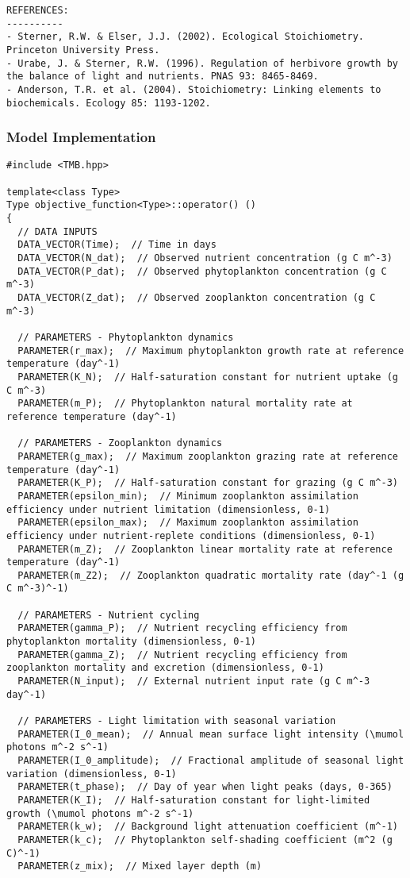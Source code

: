 \begin{lstlisting}
REFERENCES:
----------
- Sterner, R.W. & Elser, J.J. (2002). Ecological Stoichiometry. Princeton University Press.
- Urabe, J. & Sterner, R.W. (1996). Regulation of herbivore growth by the balance of light and nutrients. PNAS 93: 8465-8469.
- Anderson, T.R. et al. (2004). Stoichiometry: Linking elements to biochemicals. Ecology 85: 1193-1202.
\end{lstlisting}

\subsubsection{Model Implementation}
\begin{lstlisting}
#include <TMB.hpp>

template<class Type>
Type objective_function<Type>::operator() ()
{
  // DATA INPUTS
  DATA_VECTOR(Time);  // Time in days
  DATA_VECTOR(N_dat);  // Observed nutrient concentration (g C m^-3)
  DATA_VECTOR(P_dat);  // Observed phytoplankton concentration (g C m^-3)
  DATA_VECTOR(Z_dat);  // Observed zooplankton concentration (g C m^-3)
  
  // PARAMETERS - Phytoplankton dynamics
  PARAMETER(r_max);  // Maximum phytoplankton growth rate at reference temperature (day^-1)
  PARAMETER(K_N);  // Half-saturation constant for nutrient uptake (g C m^-3)
  PARAMETER(m_P);  // Phytoplankton natural mortality rate at reference temperature (day^-1)
  
  // PARAMETERS - Zooplankton dynamics
  PARAMETER(g_max);  // Maximum zooplankton grazing rate at reference temperature (day^-1)
  PARAMETER(K_P);  // Half-saturation constant for grazing (g C m^-3)
  PARAMETER(epsilon_min);  // Minimum zooplankton assimilation efficiency under nutrient limitation (dimensionless, 0-1)
  PARAMETER(epsilon_max);  // Maximum zooplankton assimilation efficiency under nutrient-replete conditions (dimensionless, 0-1)
  PARAMETER(m_Z);  // Zooplankton linear mortality rate at reference temperature (day^-1)
  PARAMETER(m_Z2);  // Zooplankton quadratic mortality rate (day^-1 (g C m^-3)^-1)
  
  // PARAMETERS - Nutrient cycling
  PARAMETER(gamma_P);  // Nutrient recycling efficiency from phytoplankton mortality (dimensionless, 0-1)
  PARAMETER(gamma_Z);  // Nutrient recycling efficiency from zooplankton mortality and excretion (dimensionless, 0-1)
  PARAMETER(N_input);  // External nutrient input rate (g C m^-3 day^-1)
  
  // PARAMETERS - Light limitation with seasonal variation
  PARAMETER(I_0_mean);  // Annual mean surface light intensity (\mumol photons m^-2 s^-1)
  PARAMETER(I_0_amplitude);  // Fractional amplitude of seasonal light variation (dimensionless, 0-1)
  PARAMETER(t_phase);  // Day of year when light peaks (days, 0-365)
  PARAMETER(K_I);  // Half-saturation constant for light-limited growth (\mumol photons m^-2 s^-1)
  PARAMETER(k_w);  // Background light attenuation coefficient (m^-1)
  PARAMETER(k_c);  // Phytoplankton self-shading coefficient (m^2 (g C)^-1)
  PARAMETER(z_mix);  // Mixed layer depth (m)
  

\end{lstlisting}

